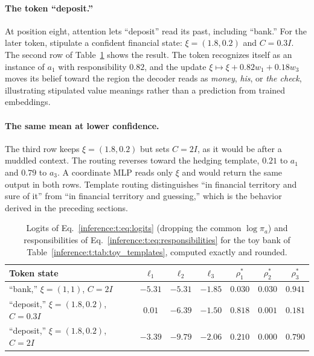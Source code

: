 \documentclass[11pt]{article}
\theoremstyle{definition}
\theoremstyle{remark}
\begin{document}
\paragraph{The token ``deposit.''}
At position eight, attention lets ``deposit'' read its past, including ``bank.'' For the later token, stipulate a confident financial state: $\xi=(1.8,0.2)$ and $C=0.3I$. The second row of Table~\ref{inference:t:tab:toy_routing} shows the result. The token recognizes itself as an instance of $a_1$ with responsibility $0.82$, and the update $\xi\mapsto\xi+0.82w_1+0.18w_3$ moves its belief toward the region the decoder reads as \emph{money}, \emph{his}, or \emph{the check}, illustrating stipulated value meanings rather than a prediction from trained embeddings.

\paragraph{The same mean at lower confidence.}
The third row keeps $\xi=(1.8,0.2)$ but sets $C=2I$, as it would be after a muddled context. The routing reverses toward the hedging template, $0.21$ to $a_1$ and $0.79$ to $a_3$. A coordinate MLP reads only $\xi$ and would return the same output in both rows. Template routing distinguishes ``in financial territory and sure of it'' from ``in financial territory and guessing,'' which is the behavior derived in the preceding sections.

\begin{table}[h]
\centering
\begin{tabular}{@{}lcccccc@{}}
\toprule
Token state & $\ell_{1}$ & $\ell_{2}$ & $\ell_{3}$ & $\rho^{*}_{1}$ & $\rho^{*}_{2}$ & $\rho^{*}_{3}$ \\
\midrule
``bank,'' $\xi=(1,1)$, $C=2I$ & $-5.31$ & $-5.31$ & $-1.85$ & $0.030$ & $0.030$ & $0.941$ \\
``deposit,'' $\xi=(1.8,0.2)$, $C=0.3I$ & $0.01$ & $-6.39$ & $-1.50$ & $0.818$ & $0.001$ & $0.181$ \\
``deposit,'' $\xi=(1.8,0.2)$, $C=2I$ & $-3.39$ & $-9.79$ & $-2.06$ & $0.210$ & $0.000$ & $0.790$ \\
\bottomrule
\end{tabular}
\caption{Logits of Eq.~\eqref{inference:t:eq:logits} (dropping the common $\log\pi_a$) and responsibilities of Eq.~\eqref{inference:t:eq:responsibilities} for the toy bank of Table~\ref{inference:t:tab:toy_templates}, computed exactly and rounded.}
\label{inference:t:tab:toy_routing}
\end{table}
\end{document}
